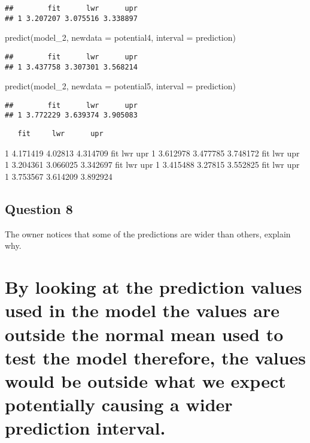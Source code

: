 \documentclass[
]{article}
\newenvironment{Shaded}{\begin{snugshade}}{\end{snugshade}}
\newcommand{\AttributeTok}[1]{\textcolor[rgb]{0.77,0.63,0.00}{#1}}
\newcommand{\FunctionTok}[1]{\textcolor[rgb]{0.00,0.00,0.00}{#1}}
\newcommand{\NormalTok}[1]{#1}
\newcommand{\StringTok}[1]{\textcolor[rgb]{0.31,0.60,0.02}{#1}}
\begin{document}
\begin{verbatim}
##        fit      lwr      upr
## 1 3.207207 3.075516 3.338897
\end{verbatim}

\begin{Shaded}
\begin{Highlighting}[]
\FunctionTok{predict}\NormalTok{(model\_2, }\AttributeTok{newdata =}\NormalTok{ potential4, }\AttributeTok{interval =} \StringTok{\textquotesingle{}prediction\textquotesingle{}}\NormalTok{)}
\end{Highlighting}
\end{Shaded}

\begin{verbatim}
##        fit      lwr      upr
## 1 3.437758 3.307301 3.568214
\end{verbatim}

\begin{Shaded}
\begin{Highlighting}[]
\FunctionTok{predict}\NormalTok{(model\_2, }\AttributeTok{newdata =}\NormalTok{ potential5, }\AttributeTok{interval =} \StringTok{\textquotesingle{}prediction\textquotesingle{}}\NormalTok{)}
\end{Highlighting}
\end{Shaded}

\begin{verbatim}
##        fit      lwr      upr
## 1 3.772229 3.639374 3.905083
\end{verbatim}

\begin{verbatim}
   fit     lwr      upr
\end{verbatim}

1 4.171419 4.02813 4.314709 fit lwr upr 1 3.612978 3.477785 3.748172 fit
lwr upr 1 3.204361 3.066025 3.342697 fit lwr upr 1 3.415488 3.27815
3.552825 fit lwr upr 1 3.753567 3.614209 3.892924

\hypertarget{question-8}{%
\subsection{Question 8}\label{question-8}}

The owner notices that some of the predictions are wider than others,
explain why.

\hypertarget{by-looking-at-the-prediction-values-used-in-the-model-the-values-are-outside-the-normal-mean-used-to-test-the-model-therefore-the-values-would-be-outside-what-we-expect-potentially-causing-a-wider-prediction-interval.}{%
\section{By looking at the prediction values used in the model the
values are outside the normal mean used to test the model therefore, the
values would be outside what we expect potentially causing a wider
prediction
interval.}\label{by-looking-at-the-prediction-values-used-in-the-model-the-values-are-outside-the-normal-mean-used-to-test-the-model-therefore-the-values-would-be-outside-what-we-expect-potentially-causing-a-wider-prediction-interval.}}
\end{document}
